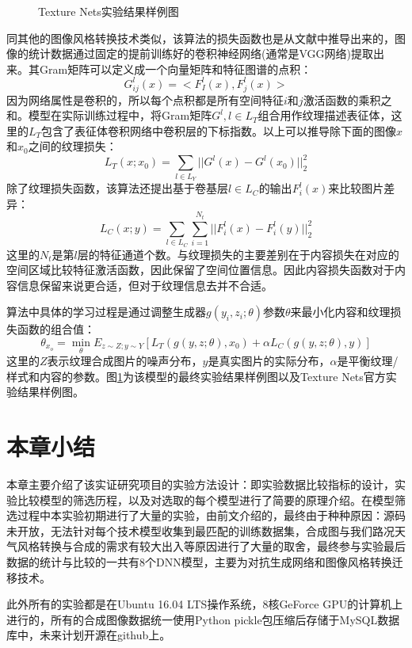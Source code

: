 \begin{figure}[b]
    \centering
    \subfigure[官方实验样例图]{
        \texttt{[image: tn\_o\_1]}
    }
    \caption{Texture Nets实验结果样例图} 
    \label{tn-example}
\end{figure}

同其他的图像风格转换技术类似，该算法的损失函数也是从文献\cite{nst}中推导出来的，图像的统计数据通过固定的提前训练好的卷积神经网络(通常是VGG网络)提取出来。其Gram矩阵可以定义成一个向量矩阵和特征图谱的点积：
$$G_{ij}^l(x)=<F_I^l(x),F_j^l(x)>$$
因为网络属性是卷积的，所以每个点积都是所有空间特征$i$和$j$激活函数的乘积之和。模型在实际训练过程中，将Gram矩阵$G^l,l\in L_T$组合用作纹理描述表征体，这里的$L_T$包含了表征体卷积网络中卷积层的下标指数。以上可以推导除下面的图像$x$和$x_0$之间的纹理损失：
$$L_T(x;x_0)=\sum_{l\in L_Y}||G^l(x)-G^l(x_0)||_2^2$$
除了纹理损失函数，该算法还提出基于卷基层$l\in L_C$的输出$F_i^l(x)$来比较图片差异：
$$L_C(x;y)=\sum_{l\in L_C}\sum_{i=1}^{N_t}||F_i^l(x)-F_i^l(y)||_2^2$$
这里的$N_t$是第$l$层的特征通道个数。与纹理损失的主要差别在于内容损失在对应的空间区域比较特征激活函数，因此保留了空间位置信息。因此内容损失函数对于内容信息保留来说更合适，但对于纹理信息去并不合适。

算法中具体的学习过程是通过调整生成器$g(y_i,z_i;\theta)$参数$\theta$来最小化内容和纹理损失函数的组合值：
$$\theta_{x_o}=\min_{\theta}E_{z\sim Z;y\sim Y}[L_T(g(y,z;\theta),x_0)+\alpha L_C(g(y,z;\theta),y)]$$
这里的$Z$表示纹理合成图片的噪声分布，$y$是真实图片的实际分布，$\alpha$是平衡纹理/样式和内容的参数。图\ref{tn-example}为该模型的最终实验结果样例图以及Texture Nets官方实验结果样例图。


\section{本章小结}

本章主要介绍了该实证研究项目的实验方法设计：即实验数据比较指标的设计，实验比较模型的筛选历程，以及对选取的每个模型进行了简要的原理介绍。在模型筛选过程中本实验初期进行了大量的实验，由前文介绍的，最终由于种种原因：源码未开放，无法针对每个技术模型收集到最匹配的训练数据集，合成图与我们路况天气风格转换与合成的需求有较大出入等原因进行了大量的取舍，最终参与实验最后数据的统计与比较的一共有8个DNN模型，主要为对抗生成网络和图像风格转换迁移技术。

此外所有的实验都是在Ubuntu 16.04 LTS操作系统，8核GeForce GPU的计算机上进行的，所有的合成图像数据统一使用Python pickle包压缩后存储于MySQL数据库中，未来计划开源在github上。

